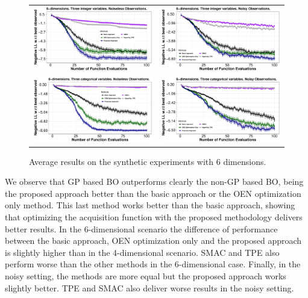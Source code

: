 \begin{figure}[htb]
\begin{tabular}{cc}
        \includegraphics[width=0.475\linewidth]{Figures/integer/synthetic/noiseless/6Dif.pdf} &
        \includegraphics[width=0.475\linewidth]{Figures/integer/synthetic/noisy/6Dinf.pdf} \\
        \includegraphics[width=0.475\linewidth]{Figures/integer/synthetic/noiseless/6Dcf.pdf} &
        \includegraphics[width=0.475\linewidth]{Figures/integer/synthetic/noisy/6Dcnf.pdf} \\
\end{tabular}
\caption{{\small Average results on the synthetic experiments with 6 dimensions.}}
\label{fig:results_synthetic_6}
\end{figure}

We observe that GP based BO outperforms clearly the non-GP based BO, being the proposed approach better than the basic approach or
the OEN optimization only method. This last method works better than the basic approach, showing that optimizing the acquisition
function with the proposed methodology delivers better results.  In the 6-dimensional scenario the difference of performance between the
basic approach, OEN optimization only and the proposed approach is slightly
higher than in the 4-dimensional scenario. SMAC and TPE also perform worse than the other methods in the 6-dimensional
case. Finally, in the noisy setting, the methods are more equal but the proposed approach works slightly better.
TPE and SMAC also deliver worse results in the noisy setting.

